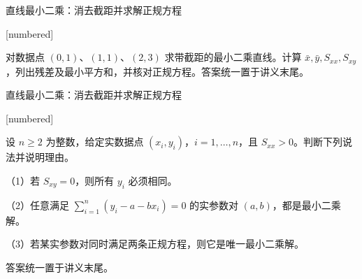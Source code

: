 \documentclass[aspectratio=169,10pt,fontset=fandol]{ctexbeamer}
\makeatletter
\newcommand{\mathagentexerciselabelcontext}[1]{%
\hypertarget<1>{#1}{}%
\edef\@currentHref{#1}%
}
\makeatother
\begin{document}
\begin{frame}[t,fragile]{直线最小二乘：消去截距并求解正规方程}
\normalsize
{\normalsize
[numbered]
\mathagentexerciselabelcontext{mathagent.exercise.U0028.0}
\begin{exercise}
\label{mathagent:exercise:332ae2e99c79cf97370ba4732967ff23f2a2c4a4b36b98eda8e910755bf43b8b}
对数据点 $(0,1)$、$(1,1)$、$(2,3)$ 求带截距的最小二乘直线。计算 $\bar{x},\bar{y},S_{xx},S_{xy}$，列出残差及最小平方和，并核对正规方程。答案统一置于讲义末尾。
\end{exercise}
}
\end{frame}
\begin{frame}[t,fragile]{直线最小二乘：消去截距并求解正规方程}
\normalsize
{\normalsize
[numbered]
\mathagentexerciselabelcontext{mathagent.exercise.U0029.0}
\begin{exercise}
\label{mathagent:exercise:b4c9c9a1fb82bcef052fdbf6e1539831ed88cee016dbcbf83a50e5e8d2311be0}
设 $n\geq2$ 为整数，给定实数据点 $(x_i,y_i)$，$i=1,\ldots,n$，且 $S_{xx}>0$。判断下列说法并说明理由。

（1）若 $S_{xy}=0$，则所有 $y_i$ 必须相同。

（2）任意满足 $\sum_{i=1}^{n}(y_i-a-bx_i)=0$ 的实参数对 $(a,b)$，都是最小二乘解。

（3）若某实参数对同时满足两条正规方程，则它是唯一最小二乘解。

答案统一置于讲义末尾。
\end{exercise}
}
\end{frame}
\end{document}
